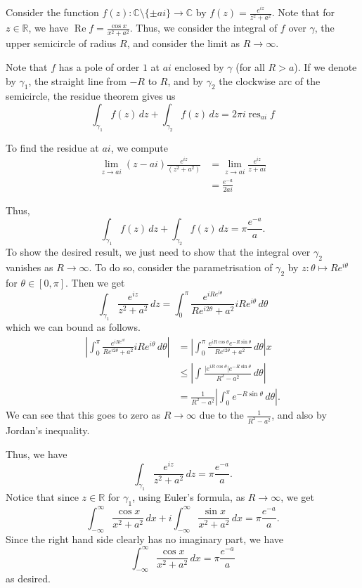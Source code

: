 \documentclass[12 pt, letterpaper]{hmcpset}
\begin{document}
\begin{solution}
	Consider the function $f(z) : \mathbb{C} \setminus \{ \pm a i \} \to \mathbb{C}$ by $f(z) = \frac{e^{iz}}{z^{2} + a^{2}}$. Note that for $z \in \mathbb{R}$, we have $\operatorname{Re} f = \frac{\cos{x}}{x^{2} + a^{2}}$. Thus, we consider the integral of $f$ over $\gamma$, the upper semicircle of radius $R$, and consider the limit as $R \to \infty$. 

	Note that $f$ has a pole of order $1$ at $ai$ enclosed by $\gamma$ (for all $R > a$). If we denote by $\gamma_{1}$, the straight line from $-R$ to $R$, and by $\gamma_{2}$ the clockwise arc of the semicircle, the residue theorem gives us
	\[
		\int_{\gamma_{1}} f(z) \, dz + \int_{\gamma_{2}} f(z) \, dz = 2 \pi i \operatorname{res}_{ai} f
	\]

	To find the residue at $ai$, we compute
	\[
		\begin{split}
			\lim_{z \to ai} (z - ai) \frac{e^{iz}}{(z^{2} + a^{2})} & = \lim_{z \to ai} \frac{e^{iz}}{z + ai} \\
										& = \frac{e^{-a}}{2 a i}
		\end{split}
	\]

	Thus,
	\[
		\int_{\gamma_{1}} f(z) \, dz + \int_{\gamma_{2}} f(z) \, dz = \pi \frac{e^{-a}}{a}.
	\]
	To show the desired result, we just need to show that the integral over $\gamma_{2}$ vanishes as $R \to \infty$. To do so, consider the parametrisation of $\gamma_{2}$ by $z : \theta \mapsto R e^{i \theta}$ for $\theta \in [0, \pi]$. Then we get
	\[
		\int_{\gamma_{1}} \frac{e^{iz}}{z^{2} + a^{2}} \, dz = \int_{0}^{\pi} \frac{e^{i R e^{i \theta}}}{R e^{i 2 \theta} + a^{2}} i R e^{i \theta} \, d \theta
	\]
	which we can bound as follows.
	\[
		\begin{split}
			\left \lvert \int_{0}^{\pi} \frac{e^{i R e^{i \theta}}}{R e^{i 2 \theta} + a^{2}} i Re^{i \theta} \, d\theta \right \rvert & = \left \lvert \int_{0}^{\pi} \frac{e^{i R \cos{\theta}} e^{- R \sin{\theta}}}{R e^{i 2 \theta} + a^{2}} \, d\theta \right \rvert x \\
																		   & \le \left \lvert \int_{} \frac{\lvert e^{i R \cos{\theta}} \rvert e^{-R \sin{\theta}}}{R^{2} - a^{2}} \, d \theta \right \rvert \\
																		   & = \frac{1}{R^{2} - a^{2}} \left \lvert \int_{0}^{\pi} e^{-R \sin{\theta}} \, d\theta \right \rvert.
		\end{split}
	\]
	We can see that this goes to zero as $R \to \infty$ due to the $\frac{1}{R^{2} -  a^{2}}$, and also by Jordan's inequality.

	Thus, we have
	\[
		\int_{\gamma_{1}} \frac{e^{iz}}{z^{2} + a^{2}} \, dz = \pi \frac{e^{-a}}{a}.
	\]
	Notice that since $z \in \mathbb{R}$ for $\gamma_{1}$, using Euler's formula, as $R \to \infty$, we get
	\[
		\int_{-\infty}^{\infty} \frac{\cos{x}}{x^{2} + a^{2}} \, dx + i \int_{-\infty} ^{\infty}\frac{\sin{x}}{x^{2} + a^{2}} \, dx = \pi \frac{e^{-a}}{a}.
	\]
	Since the right hand side clearly has no imaginary part, we have
	\[
		\int_{-\infty}^{\infty} \frac{\cos{x}}{x^{2} + a^{2}} \, dx = \pi \frac{e^{-a}}{a}
	\]
	as desired.
\end{solution}
\end{document}
